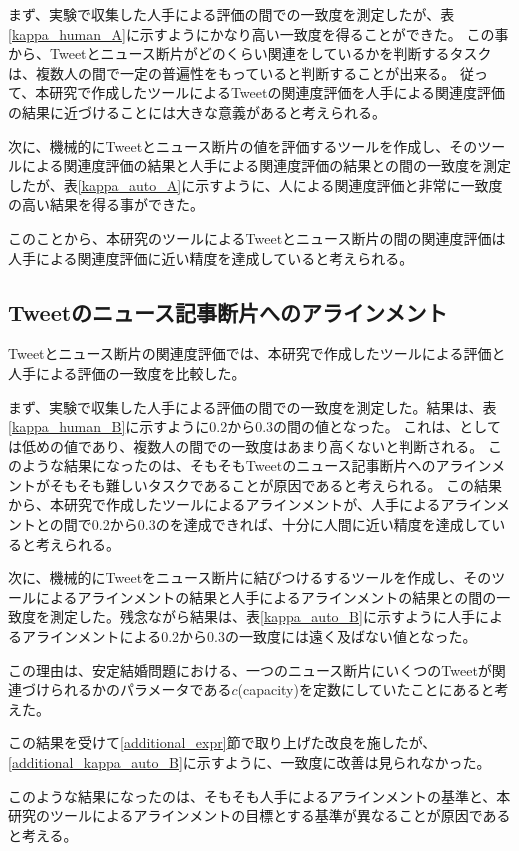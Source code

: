 \documentclass[12pt]{jarticle}
\begin{document}
まず、実験で収集した人手による評価の間での一致度を測定したが、表\ref{kappa_human_A}に示すようにかなり高い一致度を得ることができた。
この事から、Tweetとニュース断片がどのくらい関連をしているかを判断するタスクは、複数人の間で一定の普遍性をもっていると判断することが出来る。
従って、本研究で作成したツールによるTweetの関連度評価を人手による関連度評価の結果に近づけることには大きな意義があると考えられる。

次に、機械的にTweetとニュース断片の値を評価するツールを作成し、そのツールによる関連度評価の結果と人手による関連度評価の結果との間の一致度を測定したが、表\ref{kappa_auto_A}に示すように、人による関連度評価と非常に一致度の高い結果を得る事ができた。

このことから、本研究のツールによるTweetとニュース断片の間の関連度評価は人手による関連度評価に近い精度を達成していると考えられる。

\subsection{Tweetのニュース記事断片へのアラインメント}
Tweetとニュース断片の関連度評価では、本研究で作成したツールによる評価と人手による評価の一致度を比較した。

まず、実験で収集した人手による評価の間での一致度を測定した。結果は、表\ref{kappa_human_B}に示すように0.2から0.3の間の値となった。
これは、\kappac としては低めの値であり、複数人の間での一致度はあまり高くないと判断される。
このような結果になったのは、そもそもTweetのニュース記事断片へのアラインメントがそもそも難しいタスクであることが原因であると考えられる。
この結果から、本研究で作成したツールによるアラインメントが、人手によるアラインメントとの間で0.2から0.3の\kappac を達成できれば、十分に人間に近い精度を達成していると考えられる。

次に、機械的にTweetをニュース断片に結びつけるするツールを作成し、そのツールによるアラインメントの結果と人手によるアラインメントの結果との間の一致度を測定した。残念ながら結果は、表\ref{kappa_auto_B}に示すように人手によるアラインメントによる0.2から0.3の一致度には遠く及ばない値となった。

この理由は、安定結婚問題における、一つのニュース断片にいくつのTweetが関連づけられるかのパラメータである$c$(capacity)を定数にしていたことにあると考えた。

この結果を受けて\ref{additional_expr}節で取り上げた改良を施したが、\ref{additional_kappa_auto_B}に示すように、一致度に改善は見られなかった。

このような結果になったのは、そもそも人手によるアラインメントの基準と、本研究のツールによるアラインメントの目標とする基準が異なることが原因であると考える。
\end{document}

